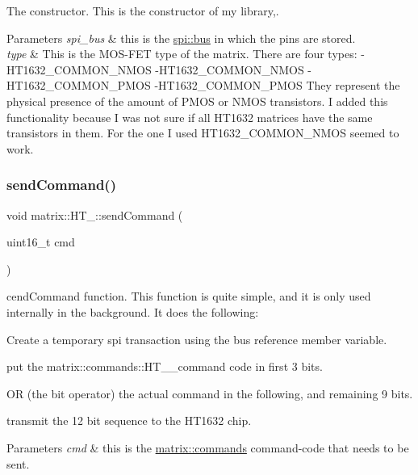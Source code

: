 The constructor. This is the constructor of my library,. 


\begin{DoxyParams}{Parameters}
{\em spi\+\_\+bus} & this is the \hyperlink{classspi_1_1bus}{spi\+::bus} in which the pins are stored. \\
\hline
{\em type} & This is the M\+O\+S-\/\+F\+ET type of the matrix. There are four types\+: -\/\+H\+T1632\+\_\+\+C\+O\+M\+M\+O\+N\+\_\+N\+M\+OS -\/\+H\+T1632\+\_\+\+C\+O\+M\+M\+O\+N\+\_\+N\+M\+OS -\/\+H\+T1632\+\_\+\+C\+O\+M\+M\+O\+N\+\_\+P\+M\+OS -\/\+H\+T1632\+\_\+\+C\+O\+M\+M\+O\+N\+\_\+P\+M\+OS They represent the physical presence of the amount of P\+M\+OS or N\+M\+OS transistors. I added this functionality because I was not sure if all H\+T1632 matrices have the same transistors in them. For the one I used H\+T1632\+\_\+\+C\+O\+M\+M\+O\+N\+\_\+N\+M\+OS seemed to work. \\
\hline
\end{DoxyParams}
\mbox{\label{group___h_t__1632_ga4e49c60cb79e44ba9f67d33c1986b5e6}} 
\subsubsection{\texorpdfstring{send\+Command()}{sendCommand()}}
{\footnotesize\ttfamily void matrix\+::\+H\+T\+\_\+::send\+Command (\begin{DoxyParamCaption}\item[{uint16\+\_\+t}]{cmd }\end{DoxyParamCaption})\hspace{0.3cm}{\ttfamily [protected]}}



cend\+Command function. This function is quite simple, and it is only used internally in the background. It does the following\+: 


\begin{DoxyItemize}
\item Create a temporary spi transaction using the bus reference member variable.
\item put the matrix\+::commands\+::\+H\+T\+\_\+\_\+command code in first 3 bits.
\item OR (the bit operator) the actual command in the following, and remaining 9 bits.
\item transmit the 12 bit sequence to the H\+T1632 chip. 
\begin{DoxyParams}{Parameters}
{\em cmd} & this is the \hyperlink{structmatrix_1_1commands}{matrix\+::commands} command-\/code that needs to be sent. \\
\hline
\end{DoxyParams}

\end{DoxyItemize}\mbox{\label{group___h_t__1632_ga942af7e6d95cc5d44778cb5ba2f56b36}} 
